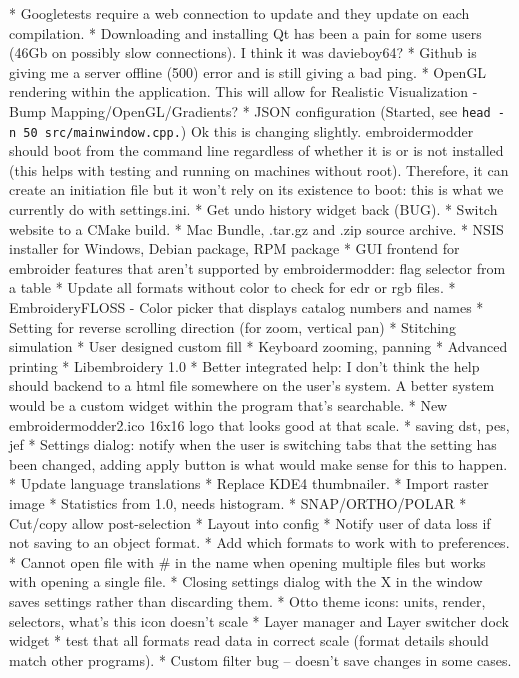 \documentclass[a4paper]{report}
\begin{document}
{{{{{{{{{{{* Googletests require a web connection to update and they update on each compilation.
* Downloading and installing Qt has been a pain for some users (46Gb on possibly slow connections). I think it was davieboy64?
* Github is giving me a server offline (500) error and is still giving a bad ping.
* OpenGL rendering within the application. This will allow for Realistic Visualization - Bump Mapping/OpenGL/Gradients?
* JSON configuration (Started, see \texttt{head\ -n\ 50\ src/mainwindow.cpp.}) Ok this is changing slightly. embroidermodder should boot from the command line regardless of whether it is or is not installed (this helps with testing and running on machines without root). Therefore, it can create an initiation file but it won't rely on its existence to boot: this is what we currently do with settings.ini.
* Get undo history widget back (BUG).
* Switch website to a CMake build.
* Mac Bundle, .tar.gz and .zip source archive.
* NSIS installer for Windows, Debian package, RPM package
* GUI frontend for embroider features that aren't supported by  embroidermodder: flag selector from a table
* Update all formats without color to check for edr or rgb files.
* EmbroideryFLOSS - Color picker that displays catalog numbers and names
* Setting for reverse scrolling direction (for zoom, vertical pan)
* Stitching simulation
* User designed custom fill
* Keyboard zooming, panning
* Advanced printing
* Libembroidery 1.0
* Better integrated help: I don't think the help should backend to a html file somewhere on the user's system. A better system would be a custom widget within the program that's searchable.
* New embroidermodder2.ico 16x16 logo that looks good at that scale.
* saving dst, pes, jef
* Settings dialog: notify when the user is switching tabs that the setting has been changed, adding apply button is what would make sense for this to happen.
* Update language translations
* Replace KDE4 thumbnailer.
* Import raster image
* Statistics from 1.0, needs histogram.
* SNAP/ORTHO/POLAR
* Cut/copy allow post-selection
* Layout into config
* Notify user of data loss if not saving to an object format.
* Add which formats to work with to preferences.
* Cannot open file with \# in the name when opening multiple files but  works with opening a single file.
* Closing settings dialog with the X in the window saves settings rather than discarding them.
* Otto theme icons: units, render, selectors, what's this icon doesn't scale
* Layer manager and Layer switcher dock widget
*  test that all formats read data in correct scale (format details should match other programs).
* Custom filter bug -- doesn't save changes in some cases.

}}}}}}}}}}}
\end{document}
